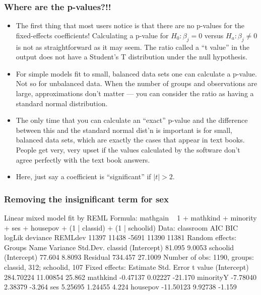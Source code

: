 \begin{frame}
  \frametitle{Where are the p-values?!!}
  \begin{itemize}
  \item The first thing that most users notice is that there are no
    p-values for the fixed-effects coefficients!  Calculating a p-value
    for $H_0:\beta_j=0$ versus $H_a:\beta_j\ne0$ is not as
    straightforward as it may seem.  The ratio called a ``t value'' in
    the output does not have a Student's T distribution under the null
    hypothesis.
  \item For simple models fit to small, balanced data sets one can
    calculate a p-value.  Not so for unbalanced data.  When the number
    of groups and observations are large, approximations don't matter
    --- you can consider the ratio as having a standard normal
    distribution.
  \item The only time that you can calculate an ``exact'' p-value
    and the difference between this and the standard normal dist'n is
    important is for small, balanced data sets, which are
    exactly the cases that appear in text books.  People get very,
    very upset if the values calculated by the software don't agree
    perfectly with the text book answers.
  \item Here, just say a coefficient is ``significant'' if $|t|> 2$.
  \end{itemize}
\end{frame}

\begin{frame}[fragile]
  \frametitle{Removing the insignificant term for sex}
\begin{Schunk}
\begin{Soutput}
Linear mixed model fit by REML 
Formula: mathgain ~ 1 + mathkind + minority + ses + housepov + (1 | classid) +      (1 | schoolid) 
   Data: classroom 
   AIC   BIC logLik deviance REMLdev
 11397 11438  -5691    11390   11381
Random effects:
 Groups   Name        Variance Std.Dev.
 classid  (Intercept)  81.095   9.0053 
 schoolid (Intercept)  77.604   8.8093 
 Residual             734.457  27.1009 
Number of obs: 1190, groups: classid, 312; schoolid, 107
Fixed effects:
             Estimate Std. Error t value
(Intercept) 284.70224   11.00854  25.862
mathkind     -0.47137    0.02227 -21.170
minorityY    -7.78040    2.38379  -3.264
ses           5.25695    1.24455   4.224
housepov    -11.50123    9.92738  -1.159
\end{Soutput}
\end{Schunk}
\end{frame}

